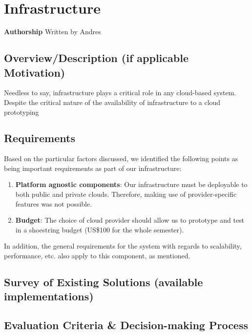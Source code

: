\section{Infrastructure}\label{infrastructure}

\textbf{Authorship} Written by Andres

\subsection{Overview/Description (if applicable
Motivation)}\label{overviewdescription-if-applicable-motivation}

Needless to say, infrastructure plays a critical role in any cloud-based
system. Despite the critical nature of the availability of
infrastructure to a cloud prototyping

\subsection{Requirements}\label{requirements}

Based on the particular factors discussed, we identified the following
points as being important requirements as part of our infrastructure:

\begin{enumerate}
\def\labelenumi{\arabic{enumi}.}
\tightlist
\item
  \textbf{Platform agnostic components}: Our infrastructure must be
  deployable to both public and private clouds. Therefore, making use of
  provider-specific features was not possible.
\item
  \textbf{Budget}: The choice of cloud provider should allow us to
  prototype and test in a shoestring budget (US\$100 for the whole
  semester).
\end{enumerate}

In addition, the general requirements for the system with regards to
scalability, performance, etc. also apply to this component, as
mentioned.

\subsection{Survey of Existing Solutions (available
implementations)}\label{survey-of-existing-solutions-available-implementations}

\subsection{Evaluation Criteria \& Decision-making
Process}\label{evaluation-criteria-decision-making-process}

